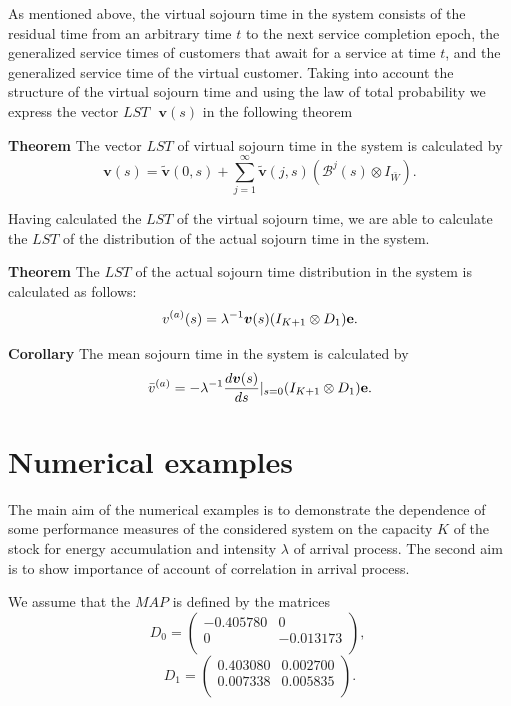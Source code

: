\documentclass[12pt, a4paper]{article}
\begin{document}
As mentioned above, the virtual sojourn time in the system
consists of the residual time from an arbitrary time $t$ to the next
service completion epoch, the generalized service times of customers
that await for a service at time $t$, and  the generalized service
time of the virtual customer.
Taking into account the structure of the virtual sojourn time and
using the  law of total probability  we  express the  vector
 $LST$ $\,\,\boldsymbol v(s)$  in the following theorem


{\bf Theorem} The vector  $LST$ of virtual sojourn time in the system is calculated by
$$
\boldsymbol v(s) =\tilde{\boldsymbol v}(0, s)+
\sum\limits_{j=1}^{\infty}\tilde{\boldsymbol v}(j,s)(\mathcal
B^{j}(s)\otimes
I_{\bar{W}}).
$$


Having calculated the  $LST$ of the virtual sojourn time, we are able to calculate the  $LST$ of the distribution of the actual sojourn time in the system.


{\bf Theorem}  The  $LST$ of the actual
sojourn time distribution in the system  is calculated as follows:
$$
v^{(a)}(s)=\lambda^{-1}\boldsymbol
v(s)(I_{K+1}\otimes D_1){\bf e}.
$$




{\bf Corollary} The mean sojourn time in the system is calculated by
$$
{\bar v}^{(a)}=-\lambda^{-1}\frac{d \boldsymbol
v(s)}{ds}|_{s=0}(I_{K+1}\otimes D_1){\bf e}.
$$





\section{Numerical examples}

The main aim of the numerical examples is to demonstrate    the dependence of some performance measures of the considered system on the capacity $K$ of the stock for energy accumulation and intensity $\lambda$ of arrival process. The second aim is to show importance of account of correlation in arrival process.

We assume that the $MAP$ is defined by the matrices
$$D_{0} = \left(\begin{array}{cc}
-0.405780 & 0\\
0& -0.013173\\
\end{array}\right),\;
$$
$$
D_{1} = \left(\begin{array}{cc}
0.403080 & 0.002700\\
0.007338 & 0.005835\\
\end{array}\right).
$$
\end{document}
